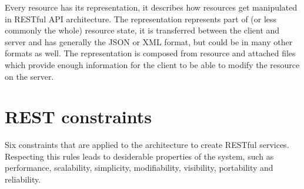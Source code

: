 Every resource has its representation, it describes how resources get manipulated in RESTful API architecture. The representation represents part of (or less commonly the whole) resource state, it is transferred between the client and server and has generally the JSON or XML format, but could be in many other formats as well. The representation is composed from resource and attached files which provide enough information for the client to be able to modify the resource on the server.

\section{REST constraints}
\label{sec:constraints}

Six constraints that are applied to the architecture to create RESTful services. Respecting this rules leads to desiderable properties of the system, such as performance, scalability, simplicity, modifiability, visibility, portability and reliability. 
